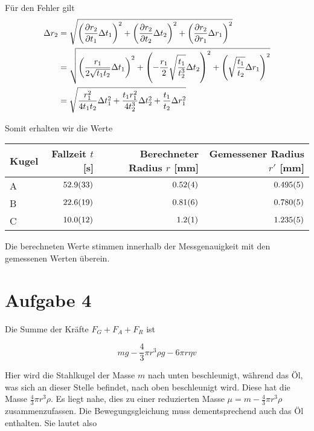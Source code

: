 \documentclass[a4paper,german,12pt,smallheadings]{scrartcl}
\begin{document}
Für den Fehler gilt
\begin{align*}
  \Delta r_2 &= \sqrt{
    \del{\frac{\partial r_2}{\partial t_1} \Delta t_1}^2 +
    \del{\frac{\partial r_2}{\partial t_2} \Delta t_2}^2 +
    \del{\frac{\partial r_2}{\partial r_1} \Delta r_1}^2
  } \\
  &= \sqrt{
    \del{ \frac{r_1}{2 \sqrt{t_1 t_2}} \Delta t_1 }^2 +
    \del{ -\frac{r_1}{2} \sqrt{ \frac{t_1}{t_2^3}} \Delta t_2 }^2 +
    \del{ \sqrt{ \frac{t_1}{t_2}} \Delta r_1 }^2
  } \\
  &= \sqrt{
    \frac{r_1^2}{4 t_1 t_2} \Delta t_1^2 + \frac{t_1 r_1^2}{4 t_2^3} \Delta t_2^2 + \frac{t_1}{t_2} \Delta r_1^2
  }
\end{align*}

Somit erhalten wir die Werte

\vspace{0.5cm}
\begin{tabular}{l|r|r|r}
  Kugel & Fallzeit $t$ [s] & Berechneter Radius $r$ [mm] & Gemessener Radius $r'$ [mm] \\
  \hline
  A & $\num{52.9+-3.3}$ & $\num{0.52+-0.04}$ & $\num{0.495+-0.005}$ \\
  B & $\num{22.6+-1.9}$ & $\num{0.81+-0.06}$ & $\num{0.780+-0.005}$ \\
  C & $\num{10.0+-1.2}$ & $\num{1.2+-0.1}$ & $\num{1.235+-0.005}$ \\
\end{tabular}
\vspace{0.5cm}

Die berechneten Werte stimmen innerhalb der Messgenauigkeit mit den
gemessenen Werten überein.

\section*{Aufgabe 4}

Die Summe der Kräfte  $F_G + F_A + F_R$ ist

\begin{equation}
  mg - \frac{4}{3} \pi r^3 \rho g - 6 \pi r \eta v
\end{equation}

Hier wird die Stahlkugel der Masse $m$ nach unten beschleunigt, während das Öl,
was sich an dieser Stelle befindet, nach oben beschleunigt wird. Diese hat die
Masse $\frac{4}{3} \pi r^3 \rho$. Es liegt nahe, dies zu einer reduzierten
Masse $\mu = m - \frac{4}{3} \pi r^3 \rho$ zusammenzufassen. Die
Bewegungsgleichung muss dementsprechend auch das Öl enthalten. Sie lautet also
\end{document}
